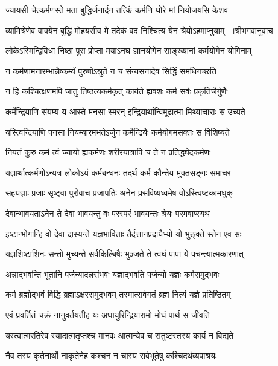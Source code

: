 \twolineshloka
{ज्यायसी चेत्कर्मणस्ते मता बुद्धिर्जनार्दन}
{तत्किं कर्मणि घोरे मां नियोजयसि केशव}


\threelineshloka
{व्यामिश्रेणेव वाक्येन बुद्धिं मोहयसीव मे}
{तदेकं वद निश्चित्य येन श्रेयोऽहमाप्नुयाम् ॥श्रीभगवानुवाच}
{}


\twolineshloka
{लोकेऽस्मिन्द्विविधा निष्ठा पुरा प्रोप्ता मयाऽनघ}
{ज्ञानयोगेन साङ्ख्यानां कर्मयोगेन योगिनाम्}


\twolineshloka
{न कर्मणामनारम्भान्नैष्कर्म्यं पुरुषोऽश्रुते}
{न च संन्यसनादेव सिद्धिं समधिगच्छति}


\twolineshloka
{न हि कश्चित्क्षणमपि जातु तिष्ठत्यकर्मकृत्}
{कार्यते ह्यवशः कर्म सर्वः प्रकृतिजैर्गुणैः}


\twolineshloka
{कर्मेन्द्रियाणि संयम्य य आस्ते मनसा स्मरन्}
{इन्द्रियार्थान्विमूढात्मा मिथ्याचाराः स उच्यते}


\twolineshloka
{यस्त्विन्द्रियाणि पनसा नियम्यारमभतेऽर्जुन}
{कर्मेन्द्रियैः कर्मयोगमसक्तः स विशिष्यते}


\twolineshloka
{नियतं कुरु कर्म त्वं ज्यायो ह्यकर्मणः}
{शरीरयात्रापि च ते न प्रतिद्ध्येदकर्मणः}


\twolineshloka
{यज्ञार्थात्कर्मणोऽन्यत्र लोकोऽयं कर्मबन्धनः}
{तदर्थं कर्म कौन्तेय मुक्तसङ्गः समाचर}


\twolineshloka
{सहयज्ञाः प्रजाः सृष्ट्वा पुरोवाच प्रजापतिः}
{अनेन प्रसविष्यध्वमेष वोऽस्त्विष्टकामधुक्}


\twolineshloka
{देवान्भावयताऽनेन ते देवा भावयन्तु वः}
{परस्परं भावयन्तः श्रेयः परमवाप्स्यथ}


\twolineshloka
{इष्टान्भोगान्हि वो देवा दास्यन्ते यज्ञभाविताः}
{तैर्दत्तानप्रदायैभ्यो यो भुङ्क्ते स्तेन एव सः}


\twolineshloka
{यज्ञशिष्टाशिनः सन्तो मुच्यन्ते सर्वकिल्बिषैः}
{भुञ्जते ते त्वघं पापा ये पचन्त्यात्मकारणात्}


\twolineshloka
{अन्नाद्भवन्ति भूतानि पर्जन्यादन्नसंभवः}
{यज्ञाद्भवति पर्जन्यो यज्ञः कर्मसमुद्भवः}


\twolineshloka
{कर्म ब्रह्मोद्भवं विद्धि ब्रह्माऽक्षरसमुद्भवम्}
{तस्मात्सर्वगतं ब्रह्म नित्यं यज्ञे प्रतिष्ठितम्}


\twolineshloka
{एवं प्रवर्तितं चक्रं नानुवर्तयतीह यः}
{अघायुरिन्द्रियारामो मोघं पार्थ स जीवति}


\twolineshloka
{यस्त्वात्मरतिरेव स्यादात्मतृप्तश्च मानवः}
{आत्मन्येव च संतुष्टस्तस्य कार्यं न विद्यते}


\twolineshloka
{नैव तस्य कृतेनार्थो नाकृतेनेह कश्चन}
{न चास्य सर्वभूतेषु कश्चिदर्थव्यपाश्रयः}


